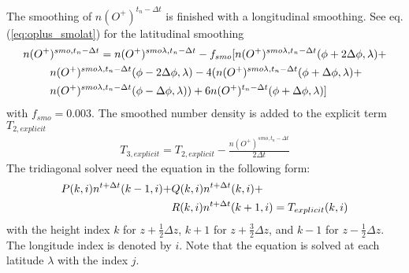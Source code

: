 %
The smoothing of $n(O^+)^{t_n- \Delta t}$ is finished with a
longitudinal smoothing. See eq. (\ref{eq:oplus_smolat}) for the
latitudinal smoothing
%
\begin{align}
 n(O^+&)^{smo,t_n- \Delta t} =  n(O^+)^{smo\lambda,t_n- \Delta t} - f_{smo}[
 n(O^+)^{smo\lambda,t_n- \Delta t} (\phi+2\Delta \phi,\lambda) +
 \notag \\
 {} & n(O^+)^{smo\lambda,t_n- \Delta t}(\phi-2\Delta \phi,\lambda) - 4 (
 n(O^+)^{smo\lambda,t_n- \Delta t}(\phi+\Delta \phi,\lambda)+ \notag
 \\
 {} & n(O^+)^{smo\lambda,t_n- \Delta t}(\phi-\Delta \phi,\lambda)) + 6n(O^+)^{t_n- \Delta
 t}(\phi+\Delta \phi,\lambda)] \label{eq:oplus_smolon}
\end{align}
%
with $f_{smo} = 0.003$. The smoothed number density is added to the
explicit term $ T_{2,explicit} $
%
\begin{align}
T_{3,explicit} = T_{2,explicit} - \frac{n(O^+)^{smo,t_n- \Delta
t}}{2 \Delta t}  \label{eq:oplus_exp3}
\end{align}
%
%
The tridiagonal solver need the equation in the following form:
%
\begin{align}
P(k,i) n^{t+\Delta t}(k-1,i) + & Q(k,i) n^{t+\Delta t}(k,i)+ \notag \\
 {} & R(k,i) n^{t+\Delta t}(k+1,i) = T_{explicit}(k,i)
\end{align}
%
with the height index $k$ for $z+\frac{1}{2}\Delta z$, $k+1$ for
$z+\frac{3}{2}\Delta z$, and $k-1$ for $z-\frac{1}{2}\Delta z$. The
longitude index is denoted by $i$. Note that the equation is solved
at each latitude $\lambda$ with the index $j$. \\


